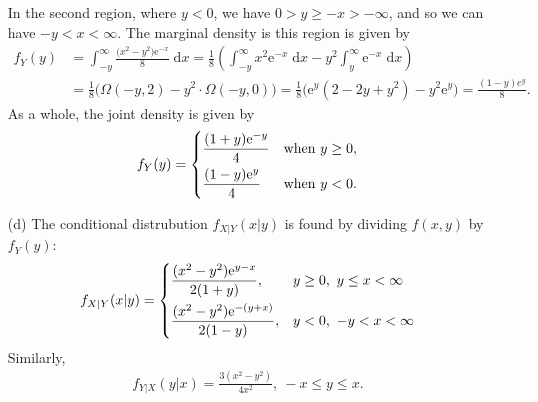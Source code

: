 \documentclass[10pt]{article}
\begin{document}
\begin{itemize}
    In the second region, where \(y < 0\), we have \(0 > y \ge -x > - \infty\), and so we can have \(-y < x < \infty\). 
    The marginal density is this region is given by 
    \begin{align*}
        f_Y(y) &= \int_{-y}^{\infty} \frac{\big( x^2 - y^2 \big) \mathrm{e}^{-x}}{8} \;\mathrm{d}x
        = \frac{1}{8} \left( \int_{-y}^{\infty} x^2 \mathrm{e}^{-x} \;\mathrm{d}x - y^2 \int_y^{\infty} \mathrm{e}^{-x} \;\mathrm{d}x \right) \\
        &= \frac{1}{8} \big( \Omega(-y,2) - y^2 \cdot \Omega(-y,0) \big)
        = \frac{1}{8} \big( \mathrm{e}^{y}(2 - 2y + y^2) - y^2\mathrm{e}^{y} \big)
        = \frac{(1 - y) e^{y}}{8}.
    \end{align*}
    As a whole, the joint density is given by 
    \begin{align*}
        f_Y(y) = \begin{dcases}
            \frac{(1 + y)\mathrm{e}^{-y}}{4} & \text{when \(y \ge 0\)}, \\
            \frac{(1 - y)\mathrm{e}^{y}}{4}  & \text{when \(y < 0\)}. \\
        \end{dcases}
    \end{align*}
    \item[(d)] The conditional distrubution \(f_{X|Y}(x|y)\) is found by dividing \(f(x,y)\) by \(f_Y(y)\):
    \begin{align*}
        f_{X|Y}(x|y) = \begin{dcases}
            \frac{(x^2 - y^2)\mathrm{e}^{y-x}}{2(1+y)},    & y \ge 0,~  y \le x < \infty \\
            \frac{(x^2 - y^2)\mathrm{e}^{-(y+x)}}{2(1-y)}, & y < 0,~    -y < x < \infty
        \end{dcases}
    \end{align*}
    Similarly, 
    \begin{align*}
        f_{Y|X}(y|x) = \frac{3(x^2 - y^2)}{4x^2}, ~ -x \le y \le x.
    \end{align*}
\end{itemize}
\end{document}
